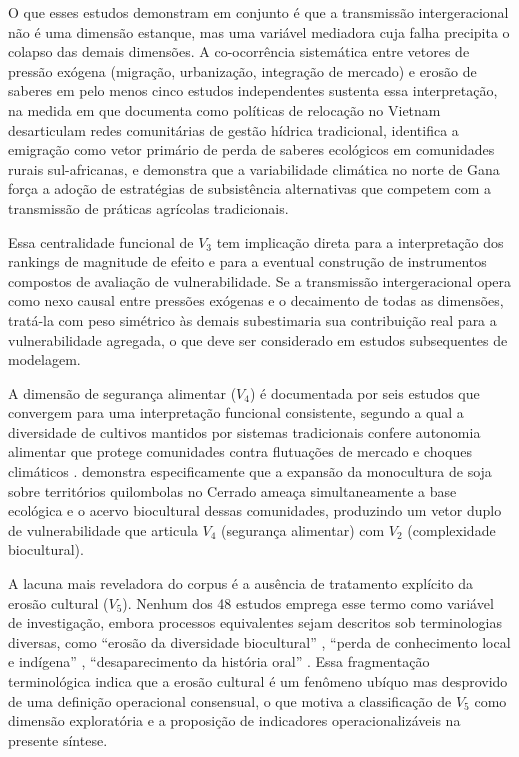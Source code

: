 O que esses estudos demonstram em conjunto é que a transmissão intergeracional não é uma dimensão estanque, mas uma variável mediadora cuja falha precipita o colapso das demais dimensões. A co-ocorrência sistemática entre vetores de pressão exógena (migração, urbanização, integração de mercado) e erosão de saberes em pelo menos cinco estudos independentes \cite{Tran2025,Moller2023,Bastos2022,VazquezDelfin2022,Aniah2019} sustenta essa interpretação, na medida em que  documenta como políticas de relocação no Vietnam desarticulam redes comunitárias de gestão hídrica tradicional,  identifica a emigração como vetor primário de perda de saberes ecológicos em comunidades rurais sul-africanas, e  demonstra que a variabilidade climática no norte de Gana força a adoção de estratégias de subsistência alternativas que competem com a transmissão de práticas agrícolas tradicionais.

Essa centralidade funcional de $V_3$ tem implicação direta para a interpretação dos rankings de magnitude de efeito e para a eventual construção de instrumentos compostos de avaliação de vulnerabilidade. Se a transmissão intergeracional opera como nexo causal entre pressões exógenas e o decaimento de todas as dimensões, tratá-la com peso simétrico às demais subestimaria sua contribuição real para a vulnerabilidade agregada, o que deve ser considerado em estudos subsequentes de modelagem.

A dimensão de segurança alimentar ($V_4$) é documentada por seis estudos que convergem para uma interpretação funcional consistente, segundo a qual a diversidade de cultivos mantidos por sistemas tradicionais confere autonomia alimentar que protege comunidades contra flutuações de mercado e choques climáticos \cite{Sibanda2025,deSousa2024,Goncalves2022,Avila2021,Edo2024,RodriguezCruz2022}.  demonstra especificamente que a expansão da monocultura de soja sobre territórios quilombolas no Cerrado ameaça simultaneamente a base ecológica e o acervo biocultural dessas comunidades, produzindo um vetor duplo de vulnerabilidade que articula $V_4$ (segurança alimentar) com $V_2$ (complexidade biocultural).

A lacuna mais reveladora do corpus é a ausência de tratamento explícito da erosão cultural ($V_5$). Nenhum dos 48 estudos emprega esse termo como variável de investigação, embora processos equivalentes sejam descritos sob terminologias diversas, como ``erosão da diversidade biocultural'' \cite{Mobarak2025}, ``perda de conhecimento local e indígena'' \cite{Suwardi2025}, ``desaparecimento da história oral'' \cite{LaRosa2021}. Essa fragmentação terminológica indica que a erosão cultural é um fenômeno ubíquo mas desprovido de uma definição operacional consensual, o que motiva a classificação de $V_5$ como dimensão exploratória e a proposição de indicadores operacionalizáveis na presente síntese.


